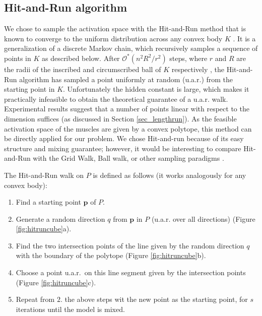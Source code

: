 \subsection{Hit-and-Run algorithm}
\label{ss:hitrun}
We chose to sample the activation space with the Hit-and-Run method that is known to converge to the uniform distribution across any convex body $K$ \cite{smith1984efficient}.
It is a generalization of a discrete Markov chain, which recursively samples a sequence of points in $K$ as described below.
After $\mathcal{O}^*(n^2R^2/r^2)$ steps, where $r$ and $R$ are the radii of the inscribed and circumscribed ball of $K$ respectively \cite{Dyer, Lovasz}, the Hit-and-Run algorithm has sampled a point uniformly at random (u.a.r.) from the starting point in $K$.
Unfortunately the hidden constant is large, which makes it practically infeasible to obtain the theoretical guarantee of a u.a.r. walk.
Experimental results suggest that a number of points linear with respect to the dimension suffices (as discussed in Section \ref{sec_lengthrun}).
As the feasible activation space of the muscles are given by a convex polytope, this method can be directly applied for our problem.
We chose Hit-and-run because of its easy structure and mixing guarantee; however, it would be interesting to compare Hit-and-Run with the Grid Walk, Ball walk, or other sampling paradigms \cite{Vempala}.

The Hit-and-Run walk on $P$ is defined as follows (it works analogously for any convex body):
\begin{enumerate}
\item Find a starting point $\textbf{p}$ of $P$.
\item Generate a random direction $q$ from $\textbf{p}$ in $P$ (u.a.r. over all directions) (Figure \ref{fig:hitruncube}a).
\item Find the two intersection points of the line given by the random direction $q$ with the boundary of the polytope (Figure \ref{fig:hitruncube}b).
\item Choose a point u.a.r.\ on this line segment given by the intersection points (Figure \ref{fig:hitruncube}c). 
\item Repeat from $2.$ the above steps wit the new point as the starting point, for $s$ iterations until the model is mixed.
\end{enumerate}

